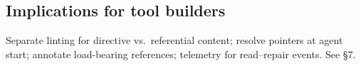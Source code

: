 \subsection{Implications for tool builders}
Separate linting for directive vs.\ referential content; resolve pointers at agent start; annotate load-bearing references; telemetry for read--repair events.
See  \S7.
